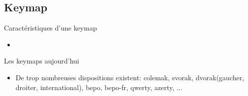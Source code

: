 \subsection{Keymap}

\begin{frame}{Caractéristiques d’une keymap}
  \begin{itemize}
    \item
  \end{itemize}
\end{frame}

\begin{frame}{Les keymaps aujourd’hui}
  \begin{itemize}
    \item De trop nombreuses dispositions existent: colemak, svorak, dvorak(gaucher, droiter, international), bepo, bepo-fr, qwerty, azerty, ...
  \end{itemize}
\end{frame}

